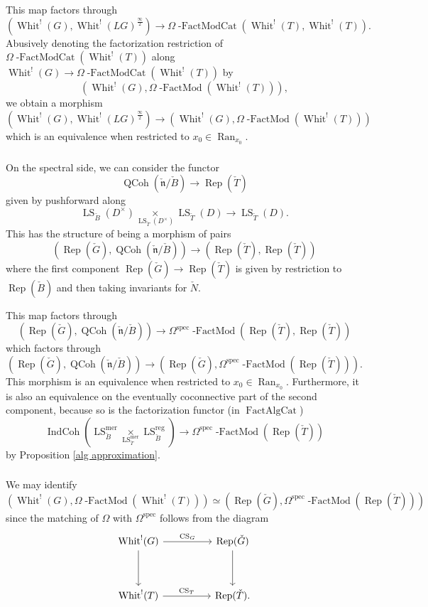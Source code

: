 \documentclass[10pt,a4paper]{amsart}
\newcommand{\on}[1]{\operatorname{#1}}
\newcommand{\Gcheck}{\check{G}}
\newcommand{\ncheck}{\check{\mathfrak{n}}}
\newcommand{\Bcheck}{\check{B}}
\newcommand{\Tcheck}{\check{T}}
\newcommand{\Ran}{\on{Ran}}
\newcommand{\FactAlgCat}{\on{FactAlgCat}}
\newcommand{\sssec}[1]{\subsubsection{}}
\begin{document}
This map factors through
$$
(\on{Whit}^!(G), \on{Whit}^!(LG)^{\frac{\infty}{2}}) \longrightarrow \Omega \on{-FactModCat}(\on{Whit}^!(T), \on{Whit}^!(T)).
$$
Abusively denoting the factorization restriction of $\Omega \on{-FactModCat}(\on{Whit}^!(T))$ along $\on{Whit}^!(G) \to \Omega \on{-FactModCat}(\on{Whit}^!(T))$ by
$$
(\on{Whit}^!(G), \Omega \on{-FactMod}(\on{Whit}^!(T))),
$$
we obtain a morphism
$$
(\on{Whit}^!(G), \on{Whit}^!(LG)^{\frac{\infty}{2}}) \longrightarrow (\on{Whit}^!(G), \Omega \on{-FactMod}(\on{Whit}^!(T)))
$$
which is an equivalence when restricted to $x_0 \in \Ran_{x_0}$.

\sssec{}
On the spectral side, we can consider the functor
$$
\on{QCoh}(\ncheck/\Bcheck) \longrightarrow \on{Rep}(\Tcheck)
$$
given by pushforward along
$$
\on{LS}_{\Bcheck}(D^{\times}) \underset{\on{LS}_{\Tcheck}(D^{\times})}{\times} \on{LS}_{\Tcheck}(D) \longrightarrow \on{LS}_{\Tcheck}(D).
$$
This has the structure of being a morphism of pairs
$$
(\on{Rep}(\Gcheck), \on{QCoh}(\ncheck/\Bcheck)) \longrightarrow (\on{Rep}(\Tcheck), \on{Rep}(\Tcheck))
$$
where the first component $\on{Rep}(\Gcheck) \to \on{Rep}(\Tcheck)$ is given by restriction to $\on{Rep}(\Bcheck)$ and then taking invariants for $\check{N}$.

This map factors through
$$
(\on{Rep}(\Gcheck), \on{QCoh}(\ncheck/\Bcheck)) \longrightarrow \Omega^{\on{spec}}\on{-FactMod}(\on{Rep}(\Tcheck), \on{Rep}(\Tcheck))
$$
which factors through
$$
(\on{Rep}(\Gcheck), \on{QCoh}(\ncheck/\Bcheck)) \longrightarrow (\on{Rep}(\Gcheck), \Omega^{\on{spec}}\on{-FactMod}(\on{Rep}(\Tcheck))).
$$
This morphism is an equivalence when restricted to $x_0 \in \Ran_{x_0}$. Furthermore, it is also an equivalence on the eventually coconnective part of the second component, because so is the factorization functor (in $\FactAlgCat$)
$$
\on{IndCoh}(\on{LS}_{\Bcheck}^{\on{mer}} \underset{\on{LS}_{\Tcheck}^{\on{mer}}}{\times} \on{LS}_{\Bcheck}^{\on{reg}}) \longrightarrow \Omega^{\on{spec}}\on{-FactMod}(\on{Rep}(\Tcheck))
$$
by Proposition \ref{alg approximation}.

\sssec{}
We may identify
$$
(\on{Whit}^!(G), \Omega \on{-FactMod}(\on{Whit}^!(T))) \simeq (\on{Rep}(\Gcheck), \Omega^{\on{spec}}\on{-FactMod}(\on{Rep}(\Tcheck)))
$$
since the matching of $\Omega$ with $\Omega^{\on{spec}}$ follows from the diagram
$$
\begin{tikzcd}
    {\on{Whit}^!(G)} && {\on{Rep}(\Gcheck)} \\
	\\
	{\on{Whit}^!(T)} && {\on{Rep}(\Tcheck).}
	\arrow["{\on{CS}_G}", from=1-1, to=1-3]
	\arrow[from=1-1, to=3-1]
	\arrow[from=1-3, to=3-3]
	\arrow["{\on{CS}_T}", from=3-1, to=3-3]
\end{tikzcd}
$$
\end{document}
